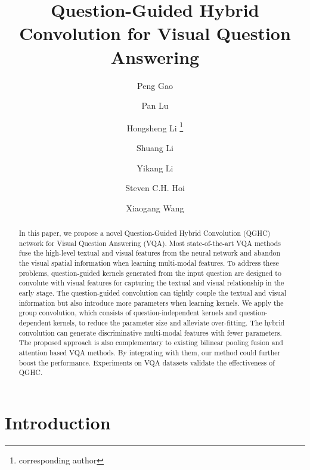 \documentclass[runningheads]{llncs}
\begin{document}
\title{Question-Guided Hybrid Convolution for Visual Question Answering} 


\author{Peng Gao \and
Pan Lu \and
Hongsheng Li  \thanks{corresponding author} \and
Shuang Li \and
Yikang Li \and
Steven C.H. Hoi \and
Xiaogang Wang}


\maketitle              \begin{abstract}
In this paper, we propose a novel Question-Guided Hybrid Convolution (QGHC) network for Visual Question Answering (VQA). Most state-of-the-art VQA methods fuse the high-level textual and visual features from the neural network and abandon the visual spatial information when learning multi-modal features.
To address these problems, question-guided kernels generated from the input question are designed to convolute with visual features for capturing the textual and visual relationship in the early stage. The question-guided convolution can tightly couple the textual and visual information but also introduce more parameters when learning kernels. We apply the group convolution, which consists of question-independent kernels and question-dependent kernels, to reduce the parameter size and alleviate over-fitting.
The hybrid convolution can generate discriminative multi-modal features with fewer parameters.
The proposed approach is also complementary to existing bilinear pooling fusion and attention based VQA methods. By integrating with them, our method could further boost the performance. Experiments on VQA datasets validate the effectiveness of QGHC. 

\end{abstract}
\section{Introduction}
\end{document}
